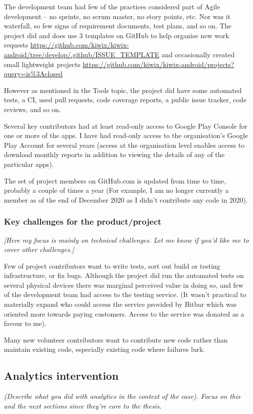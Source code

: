 The development team had few of the practices considered part of Agile development – no sprints, no scrum master, no story points, etc. Nor was it waterfall, so few signs of requirement documents, test plans, and so on. The project did and does use 3 templates on GitHub to help organise new work requests \url{https://github.com/kiwix/kiwix-android/tree/develop/.github/ISSUE\_TEMPLATE} and occasionally created small lightweight projects \url{https://github.com/kiwix/kiwix-android/projects?query=is\%3Aclosed} 

However as mentioned in the Tools topic, the project did have some automated tests, a CI, used pull requests, code coverage reports, a public issue tracker, code reviews, and so on.

Several key contributors had at least read-only access to Google Play Console for one or more of the apps. I have had read-only access to the organisation’s Google Play Account for several years (access at the organisation level enables access to download monthly reports in addition to viewing the details of any of the particular apps).

The set of project members on GitHub.com is updated from time to time, probably a couple of times a year (For example, I am no longer currently a member as of the end of December 2020 as I didn’t contribute any code in 2020).

\subsubsection{Key challenges for the product/project}
\textit{[Here my focus is mainly on technical challenges. Let me know if you’d like me to cover other challenges.]}

Few of project contributors want to write tests, sort out build or testing infrastructure, or fix bugs. Although the project did run the automated tests on several physical devices there was marginal perceived value in doing so, and few of the development team had access to the testing service. (It wasn’t practical to materially expand who could access the service provided by Bitbar which was oriented more towards paying customers. Access to the service was donated as a favour to me).

Many new volunteer contributors want to contribute new code rather than maintain existing code, especially existing code where failures lurk. 

\subsection{Analytics intervention}
\textit{(Describe what you did with analytics in the context of the case). Focus on this and the next sections since they’re core to the thesis.}

